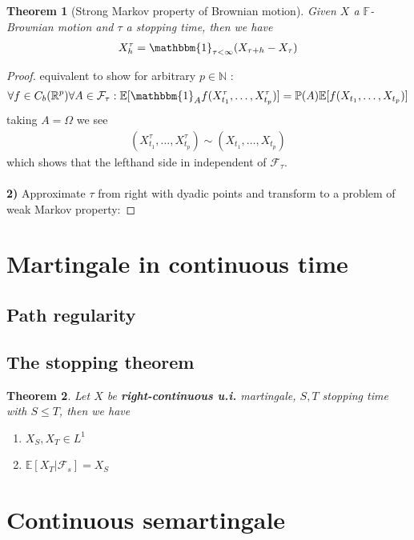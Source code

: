 \documentclass[a4paper,11pt]{book}
\newtheorem{theorem}{Theorem}[section]
\theoremstyle{definition}
\theoremstyle{remark}
\begin{document}
\begin{theorem}[Strong Markov property of Brownian motion]
Given $X$ a $\mathbb{F}$-Brownian motion and $\tau$ a stopping time, then we have
\begin{align*}
	X^\tau_h = \mathbbm{1}_{\tau < \infty} (X_{\tau + h} - X_\tau)
\end{align*}	
\end{theorem}
\begin{proof}
equivalent to show for arbitrary $p \in \mathbb{N}$  :
\begin{align*}
	\forall f \in C_b(\mathbb{R}^p) \forall A \in \mathcal{F}_\tau:
	\mathbb{E} [\mathbbm{1}_A f(X^\tau_{t_1}, \dots, X^\tau_{t_p})] = \mathbb{P}(A)\mathbb{E}[f(X_{t_1}, \dots, X_{t_p})]
\end{align*}
taking $A = \Omega$ we see
\begin{align*}
	(X^\tau_{t_1}, \dots, X^\tau_{t_p}) \sim (X_{t_1}, \dots, X_{t_p})
\end{align*}
which shows that the lefthand side in independent of $\mathcal{F}_\tau$. \\
\quad\\
\textbf{2) }Approximate $\tau$ from right with dyadic points and transform to a problem of weak Markov property:

\end{proof}


\section{Martingale in continuous time}
\subsection{Path regularity}
\subsection{The stopping theorem}
\begin{theorem}
	Let $X$ be \textbf{right-continuous u.i.} martingale, $S, T$ stopping time with $S \le T$, then we have 
	\begin{enumerate}
		\item $X_S, X_T \in L^1$ 
		\item $\mathbb{E}[X_T | \mathcal{F}_s ] = X_S$
	\end{enumerate} 
\end{theorem}


\section{Continuous semartingale}
\end{document}
